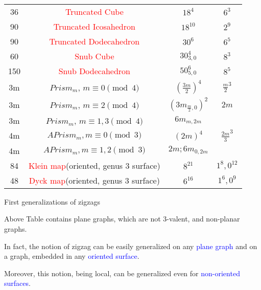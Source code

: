 \documentclass[%
pdf,
colorBG,
slideColor,
]{prosper}
\begin{document}
\begin{slide}{}

\begin{center}
{\scriptsize
\begin{tabular}{||c|c|c|c||}
\hline
\hline
36 &\textcolor{red}{Truncated Cube}&$18^4$&$6^3$\\
90 &\textcolor{red}{Truncated Icosahedron}&$18^{10}$&$2^9$\\ 
90 &\textcolor{red}{Truncated Dodecahedron}&$30^6$&$6^5$\\ 
60 &\textcolor{red}{Snub Cube}&$30_{3,0}^4$&$8^3$\\ 
150&\textcolor{red}{Snub Dodecahedron}&$50_{5,0}^6$&$8^5$\\ \hline
3m &$Prism_m$, $m\equiv 0 \pmod{4}$&$(\frac{3m}{2})^4$&$\frac{m}{2}^3$\\
3m &$Prism_m$, $m\equiv 2 \pmod{4}$&$({3m}_{\frac{m}{2},0})^2$&$2m$\\ 
3m &$Prism_m$, $m\equiv 1,3 \pmod{4}$&${6m}_{m,2m}$&\\ 
4m &$APrism_m, m \equiv 0 \pmod{3}$&$(2m)^4$&$\frac{2m}{3}^3$\\ 
4m &$APrism_m, m \equiv 1,2 \pmod{3}$&$2m;6m_{0,2m}$&\\ \hline\hline
84 &\textcolor{red}{Klein map}(oriented, genus $3$ surface)&$8^{21}$&$1^8, {0}^{12}$\\
48 &\textcolor{red}{Dyck map}(oriented, genus $3$ surface)&$6^{16}$&$1^6, {0}^9$\\
\hline
\hline
\end{tabular}
}
\end{center}


\end{slide}







\begin{slide}{First generalizations of zigzags}
\vspace{3mm}

Above Table contains plane graphs, which are not $3$-valent, and non-planar graphs.

\vspace{6mm}

In fact, the notion of zigzag can be easily generalized on any \textcolor{blue}{plane graph} and on a graph, embedded in any \textcolor{blue}{oriented surface}.

\vspace{6mm}

Moreover, this notion, being local, can be generalized even for \textcolor{blue}{non-oriented surfaces}.


\end{slide}
\end{document}
